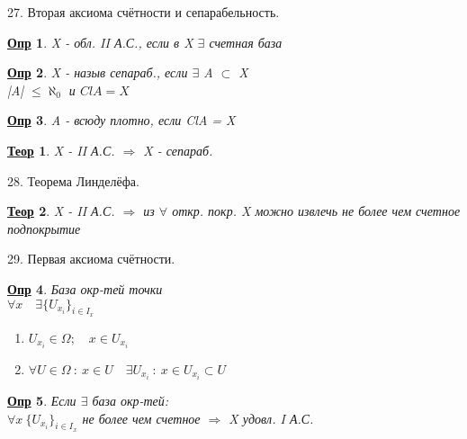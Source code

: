 \documentclass[12pt, fleqn]{article}
\newenvironment{question}[1]{\hspace*{-4em} #1}{\newpage}
\newcommand{\ra}{\Rightarrow}
\newcommand{\q}{\quad}
\theoremstyle{nonumbermarginbreak}
\newtheorem{theorem}{\hspace*{-2em}\underline{\bfseries Теор}}[section]
\newtheorem{definition}{\hspace*{-2em}\underline{\bfseries Опр}}[section]
\begin{document}
    \begin{question}{27. Вторая аксиома счётности и сепарабельность.}
        \begin{definition} 
            X - обл. II А.С., если в X $\exists$ счетная база
        \end{definition}

        \begin{definition} 
            X - назыв сепараб., если $\exists$ A $\subset$ X\\
            |A| $\leq \aleph_0$ и $Cl A = X$
        \end{definition}

        \begin{definition} 
            A - всюду плотно, если ClA = X
        \end{definition}

        \begin{theorem} 
            X - II А.С. $\ra$ X - сепараб.
        \end{theorem}
    \end{question}

    \begin{question}{28. Теорема Линделёфа.}
        \begin{theorem} 
            X - II А.С. $\ra$ из $\forall$ откр. покр. X можно извлечь не более чем счетное подпокрытие
        \end{theorem}
    \end{question}

    \begin{question}{29. Первая аксиома счётности.}
        \begin{definition} 
            База окр-тей точки\\
            $\forall x \q \exists \{U_{x_i}\}_{i \in I_x}$\\
            \begin{enumerate}
                \item $U_{x_i} \in \Omega; \q x \in U_{x_i}$
                \item $\forall U \in \Omega \ : \ x \in U \q \exists U_{x_i} \ : \ x \in U_{x_i} \subset U$
            \end{enumerate}
        \end{definition} 
        
        \begin{definition} 
            Если $\exists$  база окр-тей:\\
            $\forall x \ \{U_{x_i}\}_{i \in I_x}$ не более чем счетное $\ra$ X удовл. I А.С.
        \end{definition}
    \end{question}
\end{document}
